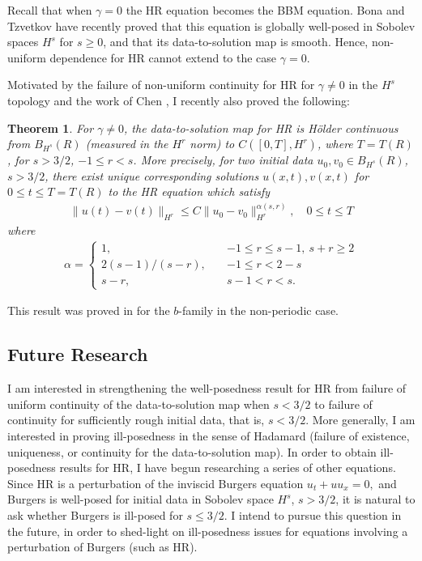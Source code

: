 \documentclass[12pt,reqno]{amsart}
\newtheorem{theorem}{Theorem}
\begin{document}
Recall that when  $\gamma=0$ the HR equation becomes the BBM
equation. Bona and Tzvetkov \cite{Bona_2009_Sharp-well-pose} have recently
proved  that this equation  is globally well-posed in  Sobolev spaces $H^s$ for
$s \ge 0$, and that its data-to-solution map is smooth. Hence, non-uniform
dependence for HR cannot extend to the case $\gamma = 0$. 

Motivated by the failure of non-uniform continuity for HR for $\gamma \neq 0$ in
the $H^{s}$ topology and the work of Chen \cite{Chen:2011fk}, I recently also
proved the following:
%
%
\begin{theorem}
For $\gamma \neq 0$, the
data-to-solution map for HR is H\"older continuous from $B_{H^{s}}(R)$ (measured in the $H^{r}$ norm)
to $C([0, T], H^{r})$, where $T = T(R)$, for $s >
3/2$, $-1 \le r < s$. 
%
More precisely, for two initial data $u_{0}, v_{0} \in B_{H^{s}}(R)$, $s > 3/2$, there exist unique
corresponding solutions $u(x,t), v(x,t)$ for $0 \le t \le T= T(R)$ to the
HR equation which satisfy 
%
%
\begin{equation*}
\begin{split}
  \| u(t) - v(t) \|_{H^{r}} \le C \| u_{0} - v_{0} \|_{H^{r}}^{\alpha(s, r)},
  \quad 0
  \le t \le T
\end{split}
\end{equation*}
%
%
where  
%
%
\begin{equation*}
\begin{split}
\alpha = 
\begin{cases}
    1,  \quad  & -1 \le r \le s-1, \ s + r \ge 2  
  \\
  2(s-1)/(s-r), \quad  &  -1 \le r < 2-s 
  \\
  s-r, \quad  & s-1 < r < s. 
\end{cases}
\end{split}
\end{equation*}
\label{thm:main-thm}
\end{theorem}
This result was proved in \cite{Chen:2011fk} for the $b$-family in the
non-periodic case.
%
%
\subsection{Future Research} 
\label{ssec:fut-res}
 I am interested in strengthening the well-posedness
result for HR from failure of uniform continuity of the data-to-solution map
when $s<3/2$ to failure of continuity for sufficiently rough initial data, that
is, $s<3/2$. More generally, I am interested in proving ill-posedness in the
sense of Hadamard (failure of existence, uniqueness, or
continuity for the data-to-solution map). In order to obtain ill-posedness
results for HR, I have begun researching a series of other equations. Since HR is a perturbation of the
inviscid Burgers equation
$
    u_{t} + u u_{x} = 0,
$
and Burgers is well-posed for initial data in Sobolev space $H^{s}$, $s > 3/2$,
it is natural to ask whether Burgers is ill-posed for $s \le 3/2$. I intend to
pursue this question in the future, in order to shed-light on ill-posedness
issues for equations involving a perturbation of Burgers (such as HR).
\end{document}
